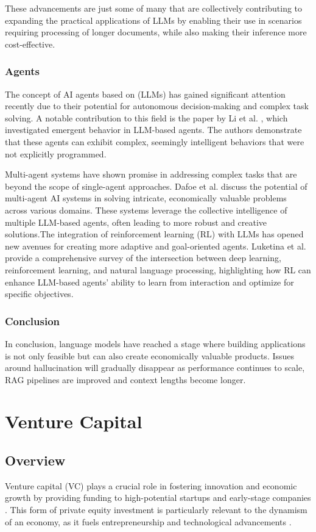\documentclass[a4paper, oneside]{discothesis}
\begin{document}
These advancements are just some of many that are collectively contributing to expanding the practical applications of LLMs by enabling their use in scenarios requiring processing of longer documents, while also making their inference more cost-effective. 

\subsection{Agents}
The concept of AI agents based on (LLMs) has gained significant attention recently due to their potential for autonomous decision-making and complex task solving. A notable contribution to this field is the paper by Li et al. \cite{li2023simulacra}, which investigated emergent behavior in LLM-based agents. The authors demonstrate that these agents can exhibit complex, seemingly intelligent behaviors that were not explicitly programmed.

Multi-agent systems have shown promise in addressing complex tasks that are beyond the scope of single-agent approaches. Dafoe et al. \cite{dafoe2020open} discuss the potential of multi-agent AI systems in solving intricate, economically valuable problems across various domains.
These systems leverage the collective intelligence of multiple LLM-based agents, often leading to more robust and creative solutions.The integration of reinforcement learning (RL) with LLMs has opened new avenues for creating more adaptive and goal-oriented agents. Luketina et al. \cite{luketina2019survey} provide a comprehensive survey of the intersection between deep learning, reinforcement learning, and natural language processing, highlighting how RL can enhance LLM-based agents' ability to learn from interaction and optimize for specific objectives.

\subsection{Conclusion}
In conclusion, language models have reached a stage where building applications is not only feasible but can also create economically valuable products. Issues around hallucination will gradually disappear as performance continues to scale, RAG pipelines are improved and context lengths become longer.

\chapter{Venture Capital}
\section{Overview}
Venture capital (VC) plays a crucial role in fostering innovation and economic growth by providing funding to high-potential startups and early-stage companies \cite{gompers2001venture}. This form of private equity investment is particularly relevant to the dynamism of an economy, as it fuels entrepreneurship and technological advancements \cite{kortum2000assessing_contribution_venture_capital}.
\end{document}
